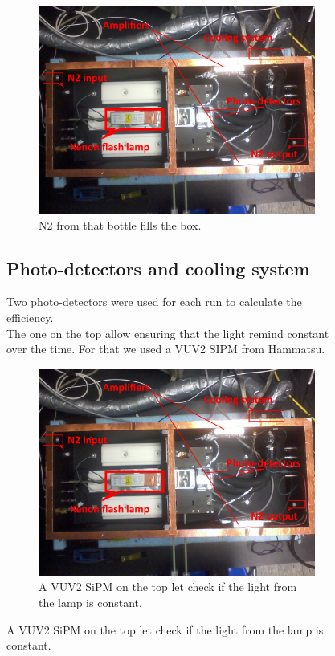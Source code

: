 \begin{figure}[!hbtp]
  \centering
  \begin{figure}[!hbtp]  
    \includegraphics[totalheight=.35\textwidth,trim=0cm 7cm 0cm 2.5cm, clip=true,]{../Pictures/blabla/box.jpg}
    \caption{N2 from that bottle fills the box.}
    \label{fig:filter_specification}
  \end{figure}
  
  
  \subsection{Photo-detectors and cooling system}
  
  Two photo-detectors were used for each run to calculate the efficiency.\\
  The one on the top allow ensuring that the light remind constant over the time. For that we used a VUV2 SIPM from Hammatsu.
  
  \centering
  \begin{figure}[!hbtp]  
    \includegraphics[totalheight=.35\textwidth,trim=0cm 7cm 0cm 2.5cm, clip=true,]{../Pictures/blabla/box.jpg}
    \caption{A VUV2 SiPM on the top let check if the  light from the lamp is constant.}
    \label{fig:top}
  \end{figure}
  

\end{figure}
